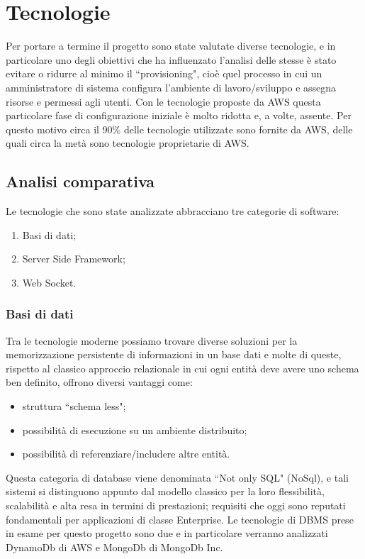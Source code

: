 \chapter{Tecnologie}

Per portare a termine il progetto sono state valutate diverse tecnologie, e in particolare uno degli obiettivi che ha influenzato l'analisi delle stesse è stato evitare o ridurre al minimo il ``provisioning",  cioè quel processo in cui un amministratore di sistema configura l'ambiente di lavoro/sviluppo e assegna risorse e permessi agli utenti. Con le tecnologie proposte da AWS questa particolare fase di configurazione iniziale è molto ridotta e, a volte, assente. Per questo motivo circa il 90\% delle tecnologie utilizzate sono fornite da AWS, delle quali circa la metà sono tecnologie proprietarie di AWS.


\section{Analisi comparativa}
Le tecnologie che sono state analizzate abbracciano tre categorie di software:
\begin{enumerate}
	\item Basi di dati;
	\item Server Side Framework;
	\item Web Socket.
\end{enumerate}

\subsection{Basi di dati}
Tra le tecnologie moderne possiamo trovare diverse soluzioni per la memorizzazione persistente di informazioni in un base dati e molte di queste, rispetto al classico approccio relazionale in cui ogni entità deve avere uno schema ben definito, offrono diversi vantaggi come:
\begin{itemize}
	\item struttura ``schema less";
	\item possibilità di esecuzione su un ambiente distribuito;
	\item possibilità di referenziare/includere altre entità.
\end{itemize}
Questa categoria di database viene denominata ``Not only SQL" (NoSql), e tali sistemi si distinguono appunto dal modello classico per la loro flessibilità, scalabilità e alta resa in termini di prestazioni; requisiti che oggi sono reputati fondamentali per applicazioni di classe Enterprise.
Le tecnologie di DBMS prese in esame per questo progetto sono due e in particolare verranno analizzati DynamoDb di AWS e MongoDb di MongoDb Inc. 
